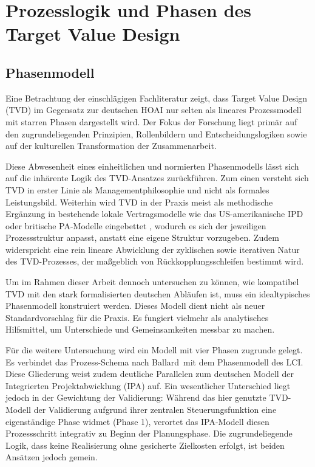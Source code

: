 \chapter{Prozesslogik und Phasen des Target Value Design}
\label{ch:4}
\section{Phasenmodell}
\label{sec:4.1}

Eine Betrachtung der einschlägigen Fachliteratur zeigt, dass Target Value Design (\acs{TVD}) im Gegensatz zur deutschen \ac{HOAI} nur selten als lineares Prozessmodell mit starren Phasen dargestellt wird. Der Fokus der Forschung liegt primär auf den zugrundeliegenden Prinzipien, Rollenbildern und Entscheidungslogiken sowie auf der kulturellen Transformation der Zusammenarbeit.\autocite[Vgl.][S.~394--396]{zimina_target_2012}\, \autocite[Vgl.][S.~3--6]{ballard_target_2025}

Diese Abwesenheit eines einheitlichen und normierten Phasenmodells lässt sich auf die inhärente Logik des \ac{TVD}-Ansatzes zurückführen. Zum einen versteht sich \ac{TVD} in erster Linie als Managementphilosophie und nicht als formales Leistungsbild. Weiterhin wird \ac{TVD} in der Praxis meist als methodische Ergänzung in bestehende lokale Vertragsmodelle wie das US-amerikanische \ac{IPD} oder britische \acl{PA}-Modelle eingebettet \autocite[Vgl.][S.~9--11]{hill_target_2017}, wodurch es sich der jeweiligen Prozessstruktur anpasst, anstatt eine eigene Struktur vorzugeben. Zudem widerspricht eine rein lineare Abwicklung der zyklischen sowie iterativen Natur des \ac{TVD}-Prozesses, der maßgeblich von Rückkopplungsschleifen bestimmt wird.

Um im Rahmen dieser Arbeit dennoch untersuchen zu können, wie kompatibel \ac{TVD} mit den stark formalisierten deutschen Abläufen ist, muss ein idealtypisches Phasenmodell konstruiert werden. Dieses Modell dient nicht als neuer Standardvorschlag für die Praxis. Es fungiert vielmehr als analytisches Hilfsmittel, um Unterschiede und Gemeinsamkeiten messbar zu machen.

Für die weitere Untersuchung wird ein Modell mit vier Phasen zugrunde gelegt. Es verbindet das Prozess-Schema nach Ballard\,\autocite[Vgl.][S.~2 ff]{ballard_target_2012} mit dem Phasenmodell des \acl{LCI}.\autocite[Vgl.][S.~8]{hill_target_2017} Diese Gliederung weist zudem deutliche Parallelen zum deutschen Modell der Integrierten Projektabwicklung (\acs{IPA}) auf. Ein wesentlicher Unterschied liegt jedoch in der Gewichtung der Validierung: Während das hier genutzte \acs{TVD}-Modell der Validierung aufgrund ihrer zentralen Steuerungsfunktion eine eigenständige Phase widmet (Phase 1), verortet das \acs{IPA}-Modell diesen Prozessschritt integrativ zu Beginn der Planungsphase. Die zugrundeliegende Logik, dass keine Realisierung ohne gesicherte Zielkosten erfolgt, ist beiden Ansätzen jedoch gemein.\autocite[Vgl.][S.~8]{haghsheno_ipa-report_2025}

